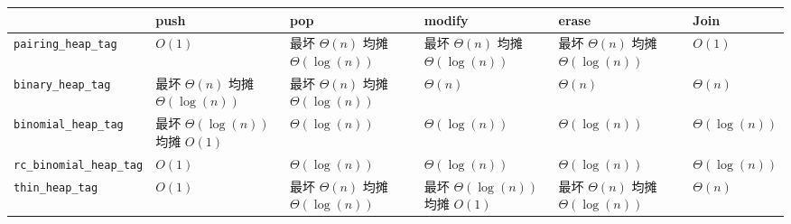 {\def\LTcaptype{none} %
\begin{longtable}[]{@{}
  >{\raggedright\arraybackslash}p{}
  >{\raggedright\arraybackslash}p{}
  >{\raggedright\arraybackslash}p{}
  >{\raggedright\arraybackslash}p{}
  >{\raggedright\arraybackslash}p{}
  >{\raggedright\arraybackslash}p{}@{}}
\toprule\noalign{}
\begin{minipage}[b]{\linewidth}\raggedright
\end{minipage} & \begin{minipage}[b]{\linewidth}\raggedright
push
\end{minipage} & \begin{minipage}[b]{\linewidth}\raggedright
pop
\end{minipage} & \begin{minipage}[b]{\linewidth}\raggedright
modify
\end{minipage} & \begin{minipage}[b]{\linewidth}\raggedright
erase
\end{minipage} & \begin{minipage}[b]{\linewidth}\raggedright
Join
\end{minipage} \\
\midrule\noalign{}
\endhead
\bottomrule\noalign{}
\endlastfoot
\texttt{pairing\_heap\_tag} & \(O(1)\) & 最坏 \(\Theta(n)\) 均摊 \(\Theta(\log(n))\) & 最坏 \(\Theta(n)\) 均摊 \(\Theta(\log(n))\) & 最坏 \(\Theta(n)\) 均摊 \(\Theta(\log(n))\) & \(O(1)\) \\
\texttt{binary\_heap\_tag} & 最坏 \(\Theta(n)\) 均摊 \(\Theta(\log(n))\) & 最坏 \(\Theta(n)\) 均摊 \(\Theta(\log(n))\) & \(\Theta(n)\) & \(\Theta(n)\) & \(\Theta(n)\) \\
\texttt{binomial\_heap\_tag} & 最坏 \(\Theta(\log(n))\) 均摊 \(O(1)\) & \(\Theta(\log(n))\) & \(\Theta(\log(n))\) & \(\Theta(\log(n))\) & \(\Theta(\log(n))\) \\
\texttt{rc\_binomial\_heap\_tag} & \(O(1)\) & \(\Theta(\log(n))\) & \(\Theta(\log(n))\) & \(\Theta(\log(n))\) & \(\Theta(\log(n))\) \\
\texttt{thin\_heap\_tag} & \(O(1)\) & 最坏 \(\Theta(n)\) 均摊 \(\Theta(\log(n))\) & 最坏 \(\Theta(\log(n))\) 均摊 \(O(1)\) & 最坏 \(\Theta(n)\) 均摊 \(\Theta(\log(n))\) & \(\Theta(n)\) \\
\end{longtable}
}

